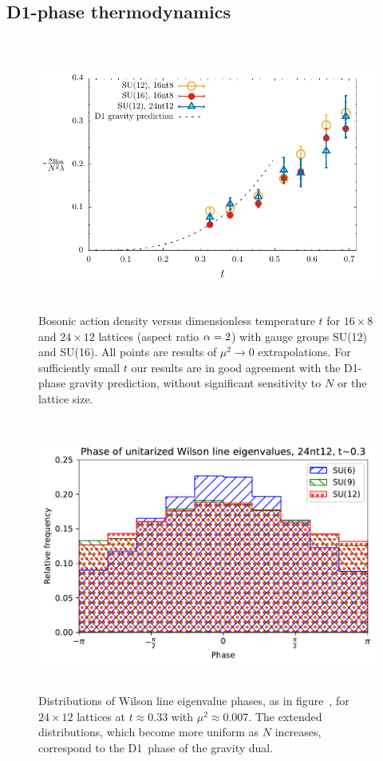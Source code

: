 \subsection{D1-phase thermodynamics}
\begin{figure}[tbp]
  \centering
  \includegraphics[height=9cm]{Figures/alpha2.pdf}
  \caption{\label{fig:alpha2}Bosonic action density versus dimensionless temperature $t$ for $16\times 8$ and $24\times 12$ lattices (aspect ratio $\alpha = 2$) with gauge groups SU(12) and SU(16).  All points are results of $\mu^2 \to 0$ extrapolations.  For sufficiently small $t$ our results are in good agreement with the D1-phase gravity prediction, without significant sensitivity to $N$ or the lattice size.}
\end{figure}
\begin{figure}[tbp]
  \centering
  \includegraphics[height=9cm]{Figures/WLeig-al2.pdf}
  \caption{\label{fig:WLeig-al2}Distributions of Wilson line eigenvalue phases, as in figure~\protect{\ref{fig:WLeig-highT}}, for $24\times 12$ lattices at $t \approx 0.33$ with $\mu^2 \approx 0.007$.  The extended distributions, which become more uniform as $N$ increases, correspond to the D1~phase of the gravity dual.}
\end{figure}

